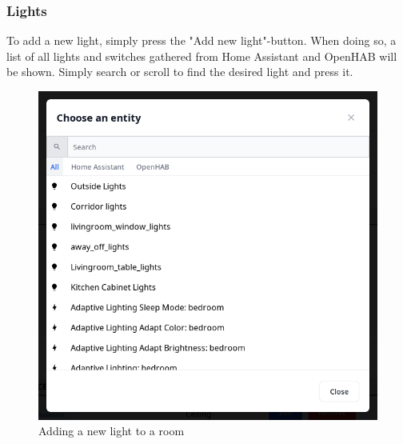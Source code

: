 \documentclass[10pt]{article}
\begin{document}
    \subsubsection{Lights}
    To add a new light, simply press the "Add new light"-button. When doing so, a list of all lights and switches gathered from Home Assistant and OpenHAB will be shown. Simply search or scroll to find the desired light and press it.
    \begin{figure}[H]
    \centering
    \includegraphics[scale=0.25]{add_new_light.png}
    \caption{Adding a new light to a room}%
    \end{figure}
    
\end{document}
